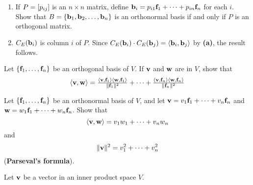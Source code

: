\begin{multicols}{2}
\begin{ex}
\begin{enumerate}[label={\alph*.}]
\item If $P = \left[ p_{ij} \right]$ is an $n \times n$ matrix, define \newline $\textbf{b}_{i} = p_{i1}\textbf{f}_{1} + \dots + p_{in}\textbf{f}_{n}$ for each $i$. Show that $B = \{\textbf{b}_{1}, \textbf{b}_{2}, \dots, \textbf{b}_{n}\}$ is an orthonormal basis if and only if $P$ is an orthogonal matrix.

\end{enumerate}
\begin{sol}
\begin{enumerate}[label={\alph*.}]
\setcounter{enumi}{1}
\item  $C_{E}(\textbf{b}_{i})$ is column $i$ of $P$. Since
  $C_{E}(\textbf{b}_{i}) \cdot C_{E}(\textbf{b}_{j}) = \langle \textbf{b}_i, \textbf{b}_j \rangle$ by \textbf{(a)}, the result follows.

\end{enumerate}
\end{sol}
\end{ex}

\begin{ex}
Let $\{\textbf{f}_{1}, \dots, \textbf{f}_{n}\}$ be an orthogonal basis of $V$. If $\textbf{v}$ and $\textbf{w}$ are in $V$, show that
\begin{equation*}
\langle \textbf{v}, \textbf{w} \rangle = 
\tfrac{\langle \textbf{v}, \textbf{f}_1 \rangle \langle \textbf{w}, \textbf{f}_1 \rangle}{\| \textbf{f}_1 \| ^2} + \dots +
\tfrac{\langle \textbf{v}, \textbf{f}_n \rangle \langle \textbf{w}, \textbf{f}_n \rangle}{\| \textbf{f}_n \| ^2}
\end{equation*}
\end{ex}

\begin{ex}
Let $\{\textbf{f}_{1}, \dots, \textbf{f}_{n}\}$ be an orthonormal basis of $V$, and let $\textbf{v} = v_{1}\textbf{f}_{1} + \dots + v_{n}\textbf{f}_{n}$ and \\ $\textbf{w} = w_{1}\textbf{f}_{1} + \dots + w_{n}\textbf{f}_{n}$. Show that 
\begin{equation*}
\langle\textbf{v}, \textbf{w}\rangle = v_{1}w_{1} + \dots + v_{n}w_{n}
\end{equation*}
 and 
\begin{equation*}
\| \textbf{v} \| ^2 = v_1^2 + \dots + v_n^2
\end{equation*}
(\textbf{Parseval's formula}).
\end{ex}

\begin{ex}
Let $\textbf{v}$ be a vector in an inner product space $V$.


\end{ex}
\end{multicols}
